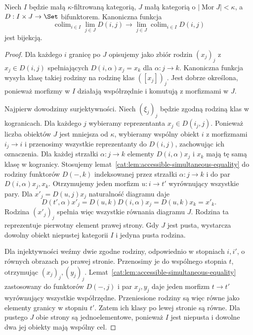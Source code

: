 \begin{twierdzenie}\label{cat:thm:accessible-filtered-limits}
Niech $I$ będzie małą $\kappa$-filtrowaną kategorią, $J$ małą kategorią o $|\operatorname{Mor}J|<\kappa$, a $D:I\times J\to\Set$ bifunktorem. Kanoniczna funkcja
\[
 \operatorname{colim}_{i\in I}\lim_{j\in J}D(i,j)
 \longrightarrow
 \lim_{j\in J}\operatorname{colim}_{i\in I}D(i,j)
\]
jest bijekcją.
\end{twierdzenie}
\begin{proof}
Dla każdego $i$ granicę po $J$ opisujemy jako zbiór rodzin $(x_j)_j$ z $x_j\in D(i,j)$ spełniających $D(i,\alpha)x_j=x_k$ dla $\alpha:j\to k$. Kanoniczna funkcja wysyła klasę takiej rodziny na rodzinę klas $([x_j])_j$. Jest dobrze określona, ponieważ morfizmy w $I$ działają współrzędnie i komutują z morfizmami w $J$.

Najpierw dowodzimy surjektywności. Niech $(\xi_j)_j$ będzie zgodną rodziną klas w kogranicach. Dla każdego $j$ wybieramy reprezentanta $x_j\in D(i_j,j)$. Ponieważ liczba obiektów $J$ jest mniejsza od $\kappa$, wybieramy wspólny obiekt $i$ z morfizmami $i_j\to i$ i przenosimy wszystkie reprezentanty do $D(i,j)$, zachowując ich oznaczenia. Dla każdej strzałki $\alpha:j\to k$ elementy $D(i,\alpha)x_j$ i $x_k$ mają tę samą klasę w kogranicy. Stosujemy lemat~\ref{cat:lem:accessible-simultaneous-equality} do rodziny funktorów $D(-,k)$ indeksowanej przez strzałki $\alpha:j\to k$ i do par $D(i,\alpha)x_j,x_k$. Otrzymujemy jeden morfizm $u:i\to t'$ wyrównujący wszystkie pary. Dla $x'_j=D(u,j)x_j$ naturalność diagramu daje
\[
 D(t',\alpha)x'_j=D(u,k)D(i,\alpha)x_j
 =D(u,k)x_k=x'_k.
\]
Rodzina $(x'_j)_j$ spełnia więc wszystkie równania diagramu $J$. Rodzina ta reprezentuje pierwotny element prawej strony. Gdy $J$ jest pusta, wystarcza dowolny obiekt niepustej kategorii $I$ i jedyna pusta rodzina.

Dla injektywności weźmy dwie zgodne rodziny, odpowiednio w stopniach $i,i'$, o równych obrazach po prawej stronie. Przenosimy je do wspólnego stopnia $t$, otrzymując $(x_j)_j,(y_j)_j$. Lemat~\ref{cat:lem:accessible-simultaneous-equality} zastosowany do funktorów $D(-,j)$ i par $x_j,y_j$ daje jeden morfizm $t\to t'$ wyrównujący wszystkie współrzędne. Przeniesione rodziny są więc równe jako elementy granicy w stopniu $t'$. Zatem ich klasy po lewej stronie są równe. Dla pustego $J$ obie strony są jednoelementowe, ponieważ $I$ jest niepusta i dowolne dwa jej obiekty mają wspólny cel.
\end{proof}

